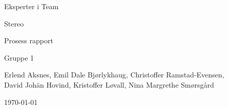 \begin{titlepage}
\begin{center}
\vspace*{1in}
{\LARGE Eksperter i Team}
\par
\vspace{1cm}


\begin{figure}[ht!]
\centering
\label{overflow}
\end{figure}


{\LARGE Stereo}
\par
\vspace{0.6in}
{\LARGE Prosess rapport}
\par
\vspace{0.2in}
{\Large Gruppe 1}
\par
\vfill
\par
\vspace{0.5in}
Erlend Aksnes, Emil Dale Bjørlykhaug, Christoffer Ramstad-Evensen, \\David Johän Hovind, Kristoffer Løvall, Nina Margrethe Smørsgård
\par
\vspace{0.4cm}
\today
\end{center}
\end{titlepage}
